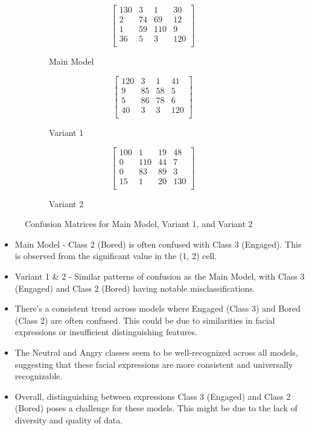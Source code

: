 \begin{figure}[h!]
    \centering
    \begin{subfigure}{.3\textwidth}
      \centering
      \[
      \begin{bmatrix}
        130 & 3 & 1 & 30 \\
        2 & 74 & 69 & 12 \\
        1 & 59 & 110 & 9 \\
        36 & 5 & 3 & 120 \\
      \end{bmatrix}
      \]
      \caption{Main Model}
    \end{subfigure}%
    \begin{subfigure}{.3\textwidth}
      \centering
      \[
      \begin{bmatrix}
        120 & 3 & 1 & 41 \\
        9 & 85 & 58 & 5 \\
        5 & 86 & 78 & 6 \\
        40 & 3 & 3 & 120 \\
      \end{bmatrix}
      \]
      \caption{Variant 1}
    \end{subfigure}%
    \begin{subfigure}{.3\textwidth}
      \centering
      \[
      \begin{bmatrix}
        100 & 1 & 19 & 48 \\
        0 & 110 & 44 & 7 \\
        0 & 83 & 89 & 3 \\
        15 & 1 & 20 & 130 \\
      \end{bmatrix}
      \]
      \caption{Variant 2}
    \end{subfigure}
    \caption{Confusion Matrices for Main Model, Variant 1, and Variant 2}
  \end{figure}

  \begin{itemize}
    \item Main Model - Class 2 (Bored) is often confused with Class 3 (Engaged). This is observed from the significant value in the (1, 2) cell.
    \item Variant 1 \& 2 - Similar patterns of confusion as the Main Model, with Class 3 (Engaged) and Class 2 (Bored) having notable misclassifications.
    \item There's a consistent trend across models where Engaged (Class 3) and Bored (Class 2) are often confused. This could be due to similarities in facial expressions or insufficient distinguishing features.
    \item The Neutral and Angry classes seem to be well-recognized across all models, suggesting that these facial expressions are more consistent and universally recognizable.
    \item Overall, distinguishing between expressions Class 3 (Engaged) and Class 2 (Bored) poses a challenge for these models. This might be due to the lack of diversity and quality of data.
\end{itemize}
